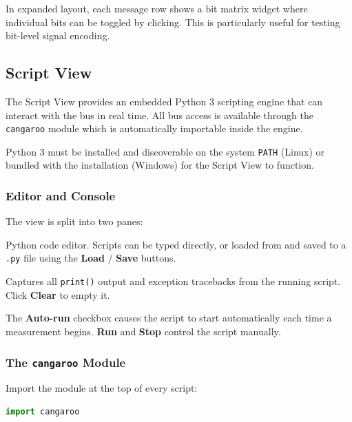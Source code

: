 \documentclass[a4paper,11pt]{article}
\newcommand{\ui}[1]{\textbf{#1}}
\newcommand{\file}[1]{\texttt{#1}}
\begin{document}
In expanded layout, each message row shows a bit matrix widget where individual bits
can be toggled by clicking. This is particularly useful for testing bit-level signal
encoding.

\subsection{Script View}
\label{sec:script}

The Script View provides an embedded Python 3 scripting engine that can interact
with the bus in real time. All bus access is available through the \texttt{cangaroo}
module which is automatically importable inside the engine.

\begin{notebox}
Python 3 must be installed and discoverable on the system \texttt{PATH} (Linux) or
bundled with the installation (Windows) for the Script View to function.
\end{notebox}

\subsubsection{Editor and Console}

The view is split into two panes:

\begin{description}[leftmargin=2em, style=nextline]
  \item[Editor (top)] Python code editor. Scripts can be typed directly, or loaded
        from and saved to a \file{.py} file using the \ui{Load} / \ui{Save} buttons.
  \item[Console (bottom)] Captures all \texttt{print()} output and exception
        tracebacks from the running script. Click \ui{Clear} to empty it.
\end{description}

The \ui{Auto-run} checkbox causes the script to start automatically each time a
measurement begins. \ui{Run} and \ui{Stop} control the script manually.

\subsubsection{The \texttt{cangaroo} Module}

Import the module at the top of every script:

\begin{lstlisting}[language=Python]
import cangaroo
\end{lstlisting}
\end{document}
